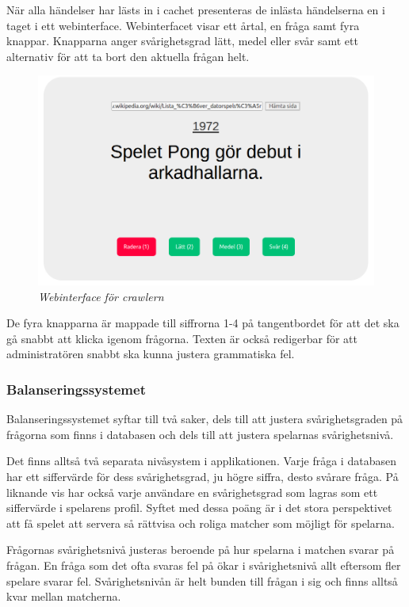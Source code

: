 \documentclass[12pt,a4paper]{article}
\begin{document}
När alla  händelser har lästs in i cachet presenteras de inlästa händelserna en i taget i ett webinterface. Webinterfacet visar ett årtal, en fråga samt fyra knappar. Knapparna anger svårighetsgrad lätt, medel eller svår samt ett alternativ för att ta bort den aktuella frågan helt.

\begin{figure}[H]
	\begin{centering}
	\includegraphics[width=\textwidth]{crawler} 
	\end{centering}
	\caption{\textit{Webinterface för crawlern}}
\end{figure}

De fyra knapparna är mappade till siffrorna 1-4 på tangentbordet för att det ska gå snabbt att klicka igenom frågorna. Texten är också redigerbar för att administratören snabbt ska kunna justera grammatiska fel.

\subsubsection{Balanseringssystemet}
Balanseringssystemet syftar till två saker, dels till att justera svårighetsgraden på frågorna som finns i databasen och dels till att justera spelarnas svårighetsnivå. 

Det finns alltså två separata nivåsystem i applikationen. Varje fråga i databasen har ett siffervärde för dess svårighetsgrad, ju högre siffra, desto svårare fråga. På liknande vis har också varje användare en svårighetsgrad som lagras som ett siffervärde i spelarens profil. Syftet med dessa poäng är i det stora perspektivet att få spelet att servera så rättvisa och roliga matcher som möjligt för spelarna. 

Frågornas svårighetsnivå justeras beroende på hur spelarna i matchen svarar på frågan. En fråga som det ofta svaras fel på ökar i svårighetsnivå allt eftersom fler spelare svarar fel. Svårighetsnivån är helt bunden till frågan i sig och finns alltså kvar mellan matcherna.
\end{document}
